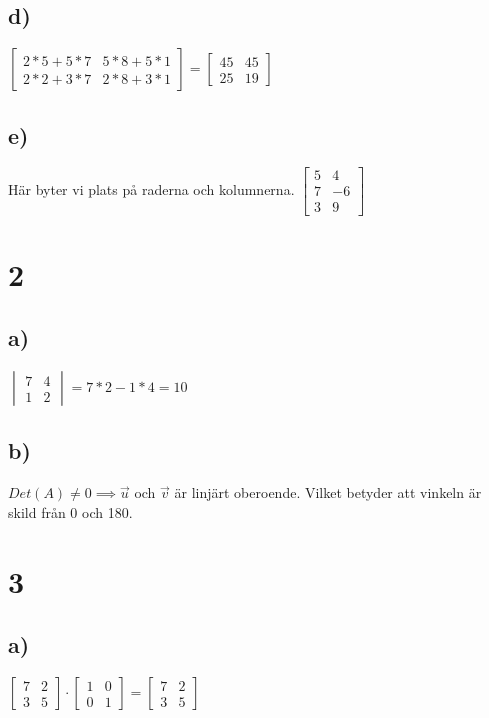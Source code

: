 \documentclass{article}
\begin{document}
\subsection*{d)}

$ 
    			\begin{bmatrix}
    			2*5+5*7 & 5*8+5*1  \\
    			2*2+3*7 & 2*8+3*1
    			\end{bmatrix}
    			=
    			\begin{bmatrix}
    			45 & 45\\
    			25 & 19
    			\end{bmatrix}
    			$

\subsection*{e)}
Här byter vi plats på raderna och kolumnerna.
				$ 
    			\begin{bmatrix}
    			5 & 4 \\
    			7 & -6 \\
    			3 & 9 
    			\end{bmatrix}
    			$
    			
    			
\section*{2}
\subsection*{a)}
				$ 
    			\begin{vmatrix}
   		 		7  & 4 \\
  		  		1  & 2
		    	\end{vmatrix}
		    	=
		    	7*2 - 1*4
		    	= 10
  			  	$
\subsection*{b)}
$Det(A) \neq 0 \implies \vec{u}$ och $\vec{v}$ är linjärt oberoende. Vilket betyder att vinkeln är skild från 0 och 180.

\section*{3}
\subsection*{a) }
	$ 
    			\begin{bmatrix}
    			7  & 2 \\
    			3  & 5
    			\end{bmatrix}
    			\cdot
    			\begin{bmatrix}
    			1 & 0  \\
    			0 & 1
    			\end{bmatrix}
    			=
    			\begin{bmatrix}
    			7  & 2 \\
    			3  & 5
    			\end{bmatrix}
    			$
    			
\end{document}
